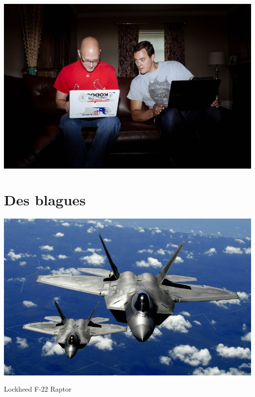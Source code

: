 \documentclass[french]{beamer}
\begin{document}
\begin{frame}
   \begin{center}
\includegraphics[height=.8\textheight]{millerval.jpg}
\end{center}
\end{frame}



\section{Des blagues}




\begin{frame}
   \begin{center}
     \includegraphics[height=.8\textheight]{raptor.jpeg}
     \caption{Lockheed F-22 Raptor}
\end{center}
\end{frame}
\end{document}
